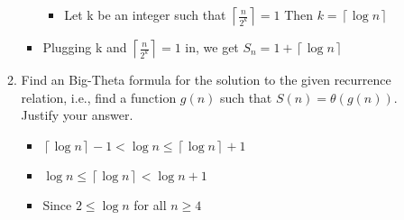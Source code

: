 \begin{enumerate}
\begin{enumerate}
\begin{itemize}
\begin{itemize}
      \item Let k be an integer such that $\left\lceil\frac{n}{2^{k}}\right\rceil=1$ Then $k=\left\lceil\log{n}\right\rceil$ 
      \end{itemize}
    \item Plugging k and $\left\lceil\frac{n}{2^{k}}\right\rceil=1$ in, we get $S_{n}=1+\left\lceil\log{n}\right\rceil$
    \end{itemize}
  \item Find an Big-Theta formula for the solution to the given recurrence relation, i.e., find a function $g(n)$ such that $S(n) = \theta(g(n))$. Justify your answer.
      \begin{itemize}
      \item $\left\lceil\log{n}\right\rceil-1 < \log{n} \leq \left\lceil\log{n}\right\rceil+1$
      \item $\log{n} \leq \left\lceil\log{n}\right\rceil < \log{n}+1$
      \item Since $2 \leq \log{n}$ for all $n \geq 4$
      \end{itemize}
  \end{enumerate}
\end{enumerate}
